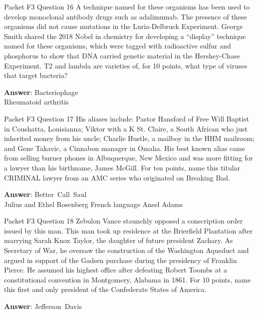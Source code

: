 \begin{frame}{Packet F3 Question 16}
A technique named for these organisms has been used to develop monoclonal antibody drugs such as adalimumab. The presence   of these organisms did not cause mutations in the Luria-Delbruck Experiment. George   Smith shared the 2018 Nobel in chemistry for developing a “display” technique named for these organisms, which were tagged with radioactive sulfur and phosphorus   to show that DNA   carried genetic material in the Hershey-Chase Experiment.   T2 and lambda are varieties of, for 10 points, what type of viruses that target bacteria?

\textbf{Answer}: Bacteriophage\\
 Rheumatoid arthritis
\end{frame}

\begin{frame}{Packet F3 Question 17}
His aliases include: Pastor   Hansford of Free Will Baptist in Coushatta, Louisianna; Viktor with a K St. Claire, a South African who just inherited money from his uncle; Charlie Hustle, a mailboy in the HHM mailroom; and Gene Takavic, a Cinnabon manager in Omaha. His best known alias came from selling burner phones in Albuquerque, New Mexico and was more fitting for a lawyer than his birthname, James McGill. For ten points,   name this titular CRIMINAL lawyer from an AMC series who originated on Breaking Bad.    

\textbf{Answer}: Better\ Call\ Saul\\
 Julius and Ethel Rosenberg
 French language
 Ansel Adams
\end{frame}

\begin{frame}{Packet F3 Question 18}
Zebulon Vance staunchly opposed a conscription order issued by this man. This man took up residence at the Brierfield Plantation after marrying Sarah Knox Taylor, the daughter of future   president Zachary. As Secretary of War, he oversaw the construction of the Washington Aqueduct and argued in support of the Gadsen purchase during the presidency of Franklin Pierce. He assumed his   highest office after defeating Robert Toombs at a constitutional   convention in Montgomery, Alabama in 1861. For 10 points,   name this first and only president of the Confederate States of America.

\textbf{Answer}: Jefferson\ Davis\\
\end{frame}


